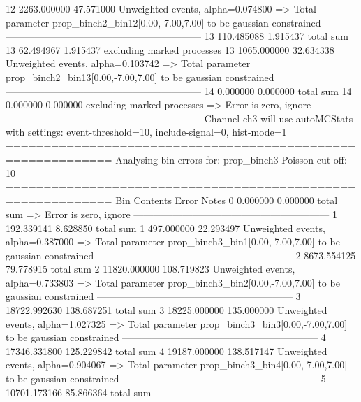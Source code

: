 12         2263.000000     47.571000       Unweighted events, alpha=0.074800
  => Total parameter prop_binch2_bin12[0.00,-7.00,7.00] to be gaussian constrained
------------------------------------------------------------
13         110.485088      1.915437        total sum                     
13         62.494967       1.915437        excluding marked processes    
13         1065.000000     32.634338       Unweighted events, alpha=0.103742
  => Total parameter prop_binch2_bin13[0.00,-7.00,7.00] to be gaussian constrained
------------------------------------------------------------
14         0.000000        0.000000        total sum                     
14         0.000000        0.000000        excluding marked processes    
  => Error is zero, ignore      
------------------------------------------------------------
Channel ch3 will use autoMCStats with settings: event-threshold=10, include-signal=0, hist-mode=1
============================================================
Analysing bin errors for: prop_binch3
Poisson cut-off: 10
============================================================
Bin        Contents        Error           Notes                         
0          0.000000        0.000000        total sum                     
  => Error is zero, ignore      
------------------------------------------------------------
1          192.339141      8.628850        total sum                     
1          497.000000      22.293497       Unweighted events, alpha=0.387000
  => Total parameter prop_binch3_bin1[0.00,-7.00,7.00] to be gaussian constrained
------------------------------------------------------------
2          8673.554125     79.778915       total sum                     
2          11820.000000    108.719823      Unweighted events, alpha=0.733803
  => Total parameter prop_binch3_bin2[0.00,-7.00,7.00] to be gaussian constrained
------------------------------------------------------------
3          18722.992630    138.687251      total sum                     
3          18225.000000    135.000000      Unweighted events, alpha=1.027325
  => Total parameter prop_binch3_bin3[0.00,-7.00,7.00] to be gaussian constrained
------------------------------------------------------------
4          17346.331800    125.229842      total sum                     
4          19187.000000    138.517147      Unweighted events, alpha=0.904067
  => Total parameter prop_binch3_bin4[0.00,-7.00,7.00] to be gaussian constrained
------------------------------------------------------------
5          10701.173166    85.866364       total sum                     
